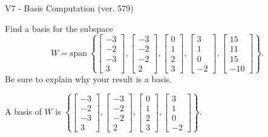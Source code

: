 \begin{exercise}
  \begin{exerciseTitle}V7 - Basis Computation (ver. 579)\end{exerciseTitle}
  \begin{exerciseStatement}
    Find a basis for the subspace 
\[W=\mathrm{span}\ \left\{\left[\begin{array}{r}
-3 \\
-2 \\
-3 \\
3
\end{array}\right] , \left[\begin{array}{r}
-3 \\
-2 \\
-2 \\
2
\end{array}\right] , \left[\begin{array}{r}
0 \\
1 \\
2 \\
3
\end{array}\right] , \left[\begin{array}{r}
3 \\
1 \\
0 \\
-2
\end{array}\right] , \left[\begin{array}{r}
15 \\
11 \\
15 \\
-10
\end{array}\right]\right\}.\]
 Be sure to explain why your result is a basis.


  \end{exerciseStatement}
  \begin{exerciseAnswer}
   A basis of \(W\) is  \(\left\{\left[\begin{array}{r}
-3 \\
-2 \\
-3 \\
3
\end{array}\right] , \left[\begin{array}{r}
-3 \\
-2 \\
-2 \\
2
\end{array}\right] , \left[\begin{array}{r}
0 \\
1 \\
2 \\
3
\end{array}\right] , \left[\begin{array}{r}
3 \\
1 \\
0 \\
-2
\end{array}\right]\right\}\).
  


  \end{exerciseAnswer}
\end{exercise}